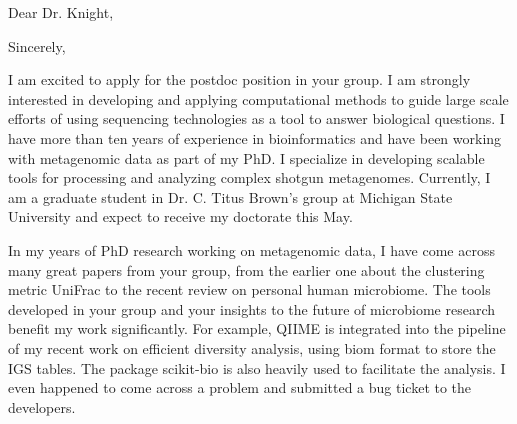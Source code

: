 \documentclass[10pt,a4paper,sans]{moderncv}        %
\begin{document}
\date{February 02, 2015}
\opening{Dear Dr. Knight,}
\closing{Sincerely,}
\makelettertitle

I am excited to apply for the postdoc position in your group.  I am strongly interested in developing 
and applying computational methods to guide large scale efforts of using sequencing technologies 
as a tool to answer biological questions.  I have more than ten years of experience in bioinformatics 
and have been working with metagenomic data as part of my PhD.  I specialize in developing 
scalable tools for processing and analyzing complex shotgun metagenomes. Currently, I am a 
graduate student in Dr. C. Titus Brown's group at Michigan State University and expect to receive 
my doctorate this May.  

In my years of PhD research working on metagenomic data, I have come across many great papers 
from your group, from the earlier one about the clustering metric  UniFrac  to the recent review  on 
personal human microbiome.  The tools developed in your group and your insights to the future of 
microbiome research benefit my work significantly.  For example, QIIME is integrated into the 
pipeline of my recent work on efficient diversity analysis, using biom format to store the IGS tables. 
The package scikit-bio is also heavily used to facilitate  the analysis. I even happened to come across 
a problem and submitted a bug ticket to the developers.  
\end{document}
